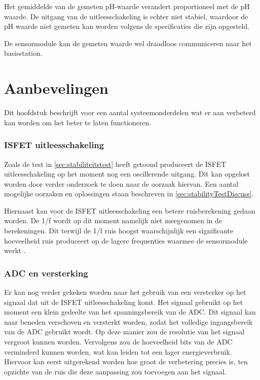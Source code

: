 Het gemiddelde van de gemeten pH-waarde verandert proportioneel met de pH waarde. De uitgang van de uitleesschakeling is echter niet stabiel, waardoor de pH waarde niet gemeten kan worden volgens de specificaties die zijn opgesteld.

De sensormodule kan de gemeten waarde wel draadloos communiceren naar het basisstation.



\newpage
\section{Aanbevelingen}
Dit hoofdstuk beschrijft voor een aantal systeemonderdelen wat er aan verbeterd kan worden om het beter te laten functioneren.

\subsubsection*{ISFET uitleesschakeling}
Zoals de test in \cref{sec:stabiliteitstest} heeft getoond produceert de ISFET uitleesschakeling op het moment nog een oscillerende uitgang. Dit kan opgelost worden door verder onderzoek te doen naar de oorzaak hiervan. Een aantal mogelijke oorzaken en oplossingen staan beschreven in \cref{sec:stabilityTestDiscuss}.

Hiernaast kan voor de ISFET uitleesschakeling een betere ruisberekening gedaan worden. De 1/f wordt op dit moment namelijk niet meegenomen in de berekeningen. Dit terwijl de 1/f ruis hoogst waarschijnlijk een significante hoeveelheid ruis produceert op de lagere frequenties waarmee de sensormodule werkt \cite{verhoeven2007structured}.

\subsubsection*{ADC en versterking}
Er kan nog verder gekeken worden naar het gebruik van een versterker op het signaal dat uit de ISFET uitleesschakeling komt. Het signaal gebruikt op het moment een klein gedeelte van het spanningsbereik van de ADC. Dit signaal kan naar beneden verschoven en versterkt worden, zodat het volledige ingangsbereik van de ADC gebruikt wordt. Op deze manier zou de resolutie van het signaal vergroot kunnen worden. Vervolgens zou de hoeveelheid bits van de ADC verminderd kunnen worden, wat kan leiden tot een lager energieverbruik.
Hiervoor kan eerst uitgerekend worden hoe groot de verbetering precies is, ten opzichte van de ruis die deze aanpassing zou toevoegen aan het signaal.

